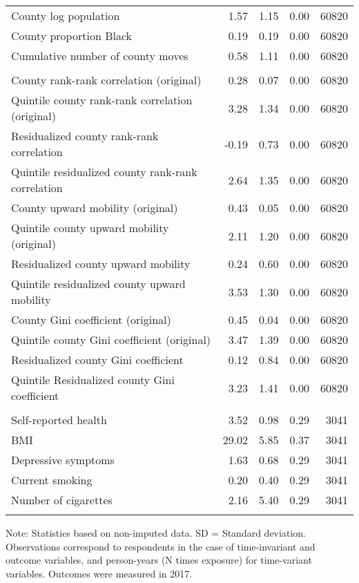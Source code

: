 \begin{table}[htp]
\begin{threeparttable}
\begin{tabular}{lrrrr}
  County log population & 1.57 & 1.15 & 0.00 & 60820 \\ 
  County proportion Black & 0.19 & 0.19 & 0.00 & 60820 \\ 
  Cumulative number of county moves & 0.58 & 1.11 & 0.00 & 60820 \\ 
   \addlinespace
\multicolumn{5}{l}{\textbf{\textit{Exposure variables}}} \\
\addlinespace
County rank-rank correlation (original) & 0.28 & 0.07 & 0.00 & 60820 \\ 
  Quintile county rank-rank correlation (original) & 3.28 & 1.34 & 0.00 & 60820 \\ 
  Residualized county rank-rank correlation & -0.19 & 0.73 & 0.00 & 60820 \\ 
  Quintile residualized county rank-rank correlation & 2.64 & 1.35 & 0.00 & 60820 \\ 
  County upward mobility (original) & 0.43 & 0.05 & 0.00 & 60820 \\ 
  Quintile county upward mobility (original) & 2.11 & 1.20 & 0.00 & 60820 \\ 
  Residualized county upward mobility & 0.24 & 0.60 & 0.00 & 60820 \\ 
  Quintile residualized county upward mobility & 3.53 & 1.30 & 0.00 & 60820 \\ 
  County Gini coefficient (original) & 0.45 & 0.04 & 0.00 & 60820 \\ 
  Quintile county Gini coefficient (original) & 3.47 & 1.39 & 0.00 & 60820 \\ 
  Residualized county Gini coefficient & 0.12 & 0.84 & 0.00 & 60820 \\ 
  Quintile Residualized county Gini coefficient & 3.23 & 1.41 & 0.00 & 60820 \\ 
   \addlinespace
\multicolumn{5}{l}{\textbf{\textit{Outcomes}}} \\
\addlinespace
Self-reported health & 3.52 & 0.98 & 0.29 & 3041 \\ 
  BMI & 29.02 & 5.85 & 0.37 & 3041 \\ 
  Depressive symptoms & 1.63 & 0.68 & 0.29 & 3041 \\ 
  Current smoking & 0.20 & 0.40 & 0.29 & 3041 \\ 
  Number of cigarettes & 2.16 & 5.40 & 0.29 & 3041 \\ 
   \addlinespace
\hline
\addlinespace
\end{tabular}
\endgroup
\begin{tablenotes}
\scriptsize
\item Note: Statistics based on non-imputed data. SD = Standard deviation. Observations correspond to respondents in the case of time-invariant and outcome variables, and person-years (N times exposure) for time-variant variables. Outcomes were measured in 2017.
\end{tablenotes}
\end{threeparttable}
\end{table}

